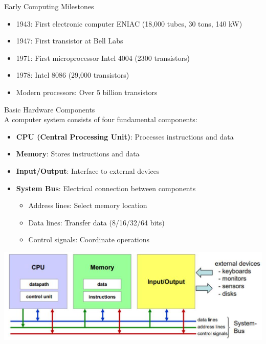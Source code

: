 \begin{example2}{Early Computing Milestones}\\
\begin{itemize}
  \item 1943: First electronic computer ENIAC (18,000 tubes, 30 tons, 140 kW)
  \item 1947: First transistor at Bell Labs
  \item 1971: First microprocessor Intel 4004 (2300 transistors)
  \item 1978: Intel 8086 (29,000 transistors)
  \item Modern processors: Over 5 billion transistors
\end{itemize}
\end{example2}

\begin{definition}{Basic Hardware Components}\\
A computer system consists of four fundamental components:
\begin{itemize}
  \item \textbf{CPU (Central Processing Unit)}: Processes instructions and data
  \item \textbf{Memory}: Stores instructions and data
  \item \textbf{Input/Output}: Interface to external devices
  \item \textbf{System Bus}: Electrical connection between components 
    \begin{itemize}
      \item Address lines: Select memory location
      \item Data lines: Transfer data (8/16/32/64 bits)
      \item Control signals: Coordinate operations
    \end{itemize}
\end{itemize}

\includegraphics[width=\linewidth]{images/2024_12_29_79e6b22f503fb7b4f718g-01(1)}
\end{definition}

